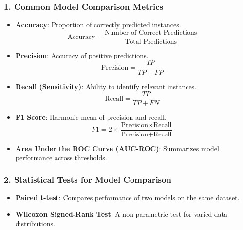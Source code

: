 \documentclass[aspectratio=169]{beamer}
\begin{document}
\begin{frame}[fragile]
  \frametitle{1. Common Model Comparison Metrics}
  \begin{itemize}
    \item \textbf{Accuracy}: Proportion of correctly predicted instances.
    \begin{equation}
        \text{Accuracy} = \frac{\text{Number of Correct Predictions}}{\text{Total Predictions}}
    \end{equation}
    
    \item \textbf{Precision}: Accuracy of positive predictions.
    \begin{equation}
        \text{Precision} = \frac{TP}{TP + FP}
    \end{equation}
    
    \item \textbf{Recall (Sensitivity)}: Ability to identify relevant instances.
    \begin{equation}
        \text{Recall} = \frac{TP}{TP + FN}
    \end{equation}
    
    \item \textbf{F1 Score}: Harmonic mean of precision and recall.
    \begin{equation}
        F1 = 2 \times \frac{\text{Precision} \times \text{Recall}}{\text{Precision} + \text{Recall}}
    \end{equation}
    
    \item \textbf{Area Under the ROC Curve (AUC-ROC)}: Summarizes model performance across thresholds.
  \end{itemize}
\end{frame}

\begin{frame}[fragile]
  \frametitle{2. Statistical Tests for Model Comparison}
  \begin{itemize}
    \item \textbf{Paired t-test}: Compares performance of two models on the same dataset.
    \item \textbf{Wilcoxon Signed-Rank Test}: A non-parametric test for varied data distributions.
  \end{itemize}
\end{frame}
\end{document}

